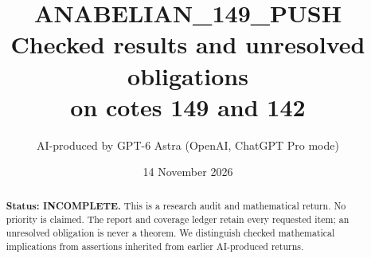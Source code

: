 \documentclass[11pt,a4paper]{article}
\title{ANABELIAN\_149\_PUSH\\Checked results and unresolved obligations\\on cotes 149 and 142}
\author{AI-produced by GPT-6 Astra (OpenAI, ChatGPT Pro mode)}
\date{14 November 2026}
\theoremstyle{definition}
\begin{document}
\maketitle
\begin{abstract}
\textbf{Status: INCOMPLETE.} This is a research audit and mathematical return. No priority is claimed. The report and coverage ledger retain every requested item; an unresolved obligation is never a theorem. We distinguish checked mathematical implications from assertions inherited from earlier AI-produced returns.
\end{abstract}
\tableofcontents











\end{document}
